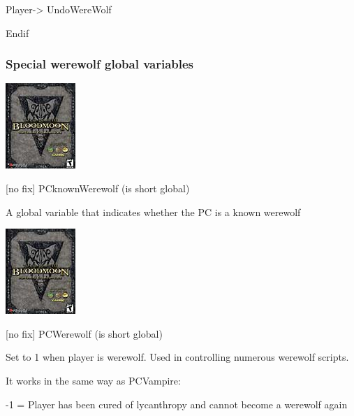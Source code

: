 Player-> UndoWereWolf

Endif

\hypertarget{section-8}{%
\subsubsection{}\label{section-8}}

\hypertarget{section-9}{%
\subsubsection{}\label{section-9}}

\hypertarget{section-10}{%
\subsubsection{}\label{section-10}}

\hypertarget{special-werewolf-global-variables}{%
\subsubsection{Special werewolf global
variables}\label{special-werewolf-global-variables}}

\includegraphics{media/image7.png}

{[}no fix{]} PCknownWerewolf (is short global)

A global variable that indicates whether the PC is a known werewolf

\includegraphics{media/image7.png}

{[}no fix{]} PCWerewolf (is short global)

Set to 1 when player is werewolf. Used in controlling numerous werewolf
scripts.

It works in the same way as PCVampire:

-1 = Player has been cured of lycanthropy and cannot become a werewolf
again

